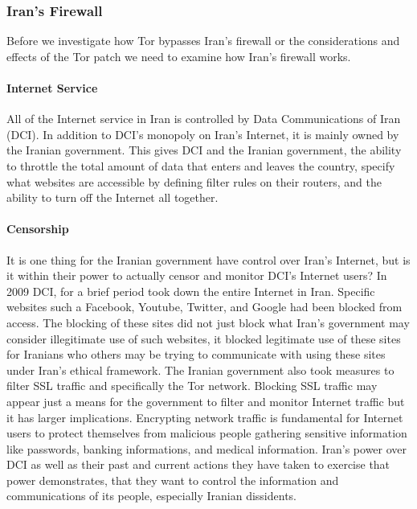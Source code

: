 \documentclass[11pt]{article}
\begin{document}
\begin{multicols}{2}
\subsubsection{Iran's Firewall}
Before we investigate how Tor bypasses Iran's firewall or the considerations and
effects of the Tor patch we need to examine how Iran's firewall works.

\paragraph{Internet Service}

All of the Internet service in Iran is controlled by Data Communications of Iran
(DCI).\cite{FindingWayAroundIranianCensorship} In addition to DCI's monopoly on
Iran's Internet, it is mainly owned by the Iranian government.\cite{
FindingWayAroundIranianCensorship, DCI:Articles} This gives DCI and the
Iranian government, the ability to throttle the total amount of data that enters
and leaves the country, specify what websites are accessible by defining filter
rules on their routers, and the ability to turn off the Internet all together.
\cite{FindingWayAroundIranianCensorship}

\paragraph{Censorship} 

It is one thing for the Iranian government have control over Iran's
Internet, but is it within their power to actually censor and monitor DCI's
Internet users? In 2009 DCI, for a brief period took down the entire Internet in 
Iran.\cite{FindingWayAroundIranianCensorship} Specific websites such a
Facebook, Youtube, Twitter, and Google had been blocked from access.\cite{
FindingWayAroundIranianCensorship, IransElectronicCurtain} The blocking of
these sites did not just block what Iran's government may consider illegitimate
use of such websites, it  blocked legitimate use of these sites 
for Iranians who others may be trying to communicate with using these sites under
Iran's ethical framework. The Iranian government also took measures to filter
SSL traffic and specifically the Tor network.\cite{Tor:IranPartiallyBlocksSSL,
IranBlocksTorSameDayFix} Blocking SSL traffic may appear just a means for the
government to filter and monitor Internet traffic but it has larger
implications. Encrypting network traffic is fundamental for Internet users to
protect themselves from malicious people gathering sensitive information like
passwords, banking informations, and medical information. Iran's power
over DCI as well as their past and current actions they have taken to exercise that
power demonstrates, that they want to control the information and communications
of its people, especially Iranian dissidents.



\end{multicols}
\end{document}
